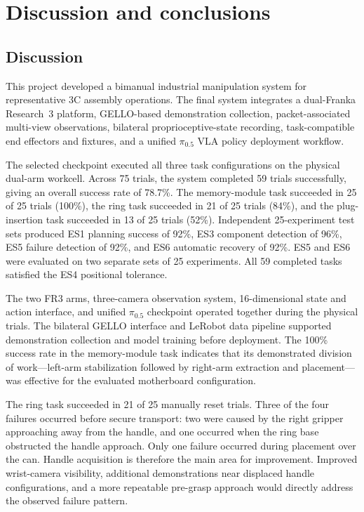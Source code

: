 
\chapter{Discussion and conclusions}\label{chap:discussion}

\section{Discussion}

This project developed a bimanual industrial manipulation system for representative 3C assembly operations. The final system integrates a dual-Franka Research~3 platform, GELLO-based demonstration collection, packet-associated multi-view observations, bilateral proprioceptive-state recording, task-compatible end effectors and fixtures, and a unified $\pi_{0.5}$ VLA policy deployment workflow.

The selected checkpoint executed all three task configurations on the physical dual-arm workcell. Across 75 trials, the system completed 59 trials successfully, giving an overall success rate of 78.7\%. The memory-module task succeeded in 25 of 25 trials (100\%), the ring task succeeded in 21 of 25 trials (84\%), and the plug-insertion task succeeded in 13 of 25 trials (52\%). Independent 25-experiment test sets produced ES1 planning success of 92\%, ES3 component detection of 96\%, ES5 failure detection of 92\%, and ES6 automatic recovery of 92\%. ES5 and ES6 were evaluated on two separate sets of 25 experiments. All 59 completed tasks satisfied the ES4 positional tolerance.

The two FR3 arms, three-camera observation system, 16-dimensional state and action interface, and unified $\pi_{0.5}$ checkpoint operated together during the physical trials. The bilateral GELLO interface and LeRobot data pipeline supported demonstration collection and model training before deployment. The 100\% success rate in the memory-module task indicates that its demonstrated division of work---left-arm stabilization followed by right-arm extraction and placement---was effective for the evaluated motherboard configuration.

The ring task succeeded in 21 of 25 manually reset trials. Three of the four failures occurred before secure transport: two were caused by the right gripper approaching away from the handle, and one occurred when the ring base obstructed the handle approach. Only one failure occurred during placement over the can. Handle acquisition is therefore the main area for improvement. Improved wrist-camera visibility, additional demonstrations near displaced handle configurations, and a more repeatable pre-grasp approach would directly address the observed failure pattern.

